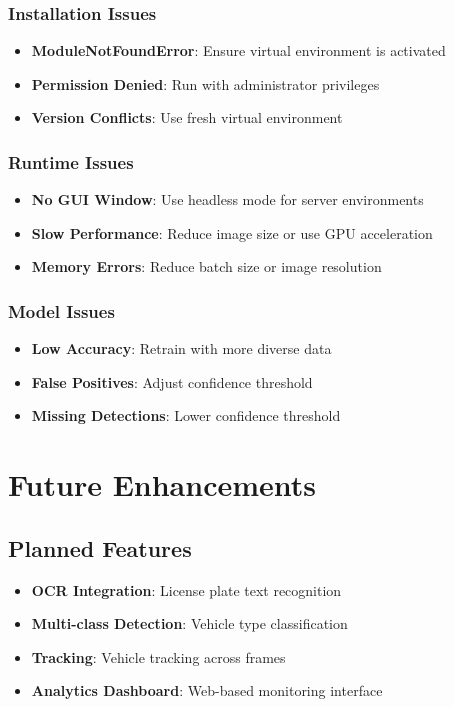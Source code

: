 \documentclass[12pt,a4paper]{article}
\begin{document}
\subsubsection{Installation Issues}
\begin{itemize}
    \item \textbf{ModuleNotFoundError}: Ensure virtual environment is activated
    \item \textbf{Permission Denied}: Run with administrator privileges
    \item \textbf{Version Conflicts}: Use fresh virtual environment
\end{itemize}

\subsubsection{Runtime Issues}
\begin{itemize}
    \item \textbf{No GUI Window}: Use headless mode for server environments
    \item \textbf{Slow Performance}: Reduce image size or use GPU acceleration
    \item \textbf{Memory Errors}: Reduce batch size or image resolution
\end{itemize}

\subsubsection{Model Issues}
\begin{itemize}
    \item \textbf{Low Accuracy}: Retrain with more diverse data
    \item \textbf{False Positives}: Adjust confidence threshold
    \item \textbf{Missing Detections}: Lower confidence threshold
\end{itemize}

\section{Future Enhancements}

\subsection{Planned Features}
\begin{itemize}
    \item \textbf{OCR Integration}: License plate text recognition
    \item \textbf{Multi-class Detection}: Vehicle type classification
    \item \textbf{Tracking}: Vehicle tracking across frames
    \item \textbf{Analytics Dashboard}: Web-based monitoring interface
\end{itemize}
\end{document}
